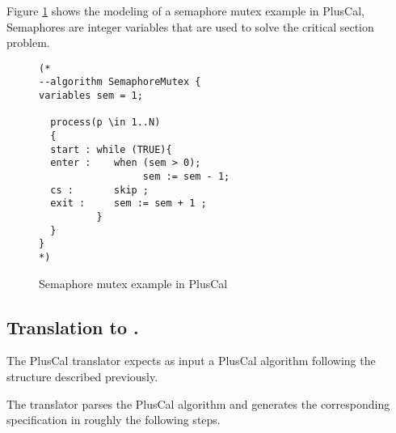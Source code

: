 Figure \ref{semaphoreEx} shows the modeling of a semaphore mutex example in PlusCal, Semaphores are integer variables that are used to solve the critical section problem.


\begin{figure}
\begin{lstlisting}[frame = tlrb, firstnumber = 1]
(*
--algorithm SemaphoreMutex {
variables sem = 1;
 
  process(p \in 1..N)
  {
  start : while (TRUE){
  enter :    when (sem > 0);
                  sem := sem - 1;            
  cs :       skip ;
  exit :     sem := sem + 1 ;
          }
  }
}
*)

\end{lstlisting}
\caption{Semaphore mutex example in PlusCal}
\label{semaphoreEx}
\end{figure} 

\subsection{Translation to \tlaplus.}
The PlusCal translator expects as input a PlusCal algorithm following the structure described previously.

The translator parses the PlusCal algorithm and generates the corresponding \tlaplus specification in roughly the following steps.

